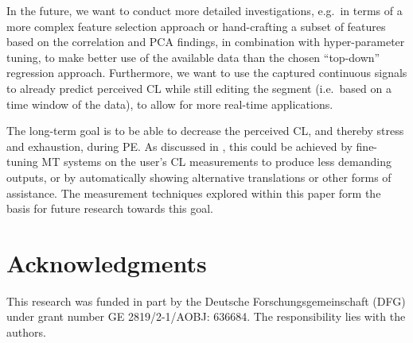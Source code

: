 \documentclass[output=paper]{langsci/langscibook}
\begin{document}
In the future, we want to conduct more detailed investigations, e.g.\ in terms of a more complex feature selection approach or hand-crafting a subset of features based on the correlation and PCA findings, in combination with hyper-parameter tuning, to make better use of the available data than the chosen ``top-down'' regression approach. %
Furthermore, we want to use the captured continuous signals to already predict perceived CL while still editing the segment (i.e.\ based on a time window of the data), to allow for more real-time applications.

The long-term goal is to be able to decrease the perceived CL, and thereby stress and exhaustion, during PE. As discussed in \citet{herbig2019chi}, this could be achieved by fine-tuning MT systems on the user's CL measurements to produce less demanding outputs, or %
by automatically showing alternative translations or other forms of assistance.
The measurement techniques explored within this paper form the basis for future research towards this goal.



\section*{Acknowledgments}
This research was funded in part by the Deutsche Forschungsgemeinschaft (DFG) under grant number GE 2819/2-1/AOBJ: 636684. The responsibility lies with the authors.

{\sloppy\printbibliography[heading=subbibliography,notkeyword=this]}
\end{document}
